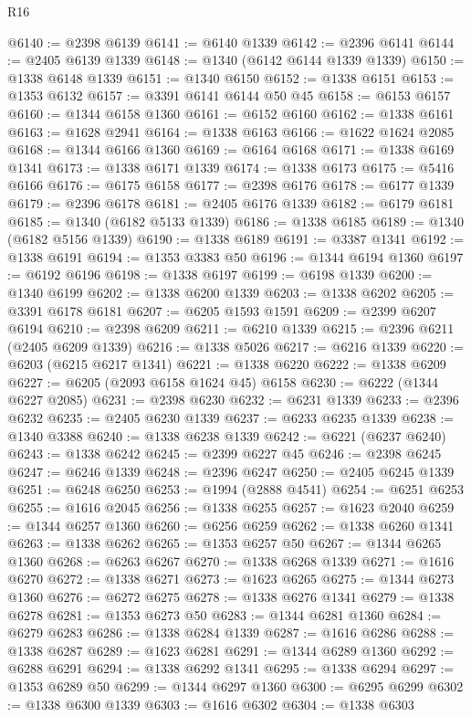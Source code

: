 \begin{lexlean}{R16}
\begin{coremodule}
@6140 := @2398 @6139
@6141 := @6140 @1339
@6142 := @2396 @6141
@6144 := @2405 @6139 @1339
@6148 := @1340 (@6142 @6144 @1339 @1339)
@6150 := @1338 @6148 @1339
@6151 := @1340 @6150
@6152 := @1338 @6151
@6153 := @1353 @6132
@6157 := @3391 @6141 @6144 @50 @45
@6158 := @6153 @6157
@6160 := @1344 @6158 @1360
@6161 := @6152 @6160
@6162 := @1338 @6161
@6163 := @1628 @2941
@6164 := @1338 @6163
@6166 := @1622 @1624 @2085
@6168 := @1344 @6166 @1360
@6169 := @6164 @6168
@6171 := @1338 @6169 @1341
@6173 := @1338 @6171 @1339
@6174 := @1338 @6173
@6175 := @5416 @6166
@6176 := @6175 @6158
@6177 := @2398 @6176
@6178 := @6177 @1339
@6179 := @2396 @6178
@6181 := @2405 @6176 @1339
@6182 := @6179 @6181
@6185 := @1340 (@6182 @5133 @1339)
@6186 := @1338 @6185
@6189 := @1340 (@6182 @5156 @1339)
@6190 := @1338 @6189
@6191 := @3387 @1341
@6192 := @1338 @6191
@6194 := @1353 @3383 @50
@6196 := @1344 @6194 @1360
@6197 := @6192 @6196
@6198 := @1338 @6197
@6199 := @6198 @1339
@6200 := @1340 @6199
@6202 := @1338 @6200 @1339
@6203 := @1338 @6202
@6205 := @3391 @6178 @6181
@6207 := @6205 @1593 @1591
@6209 := @2399 @6207 @6194
@6210 := @2398 @6209
@6211 := @6210 @1339
@6215 := @2396 @6211 (@2405 @6209 @1339)
@6216 := @1338 @5026
@6217 := @6216 @1339
@6220 := @6203 (@6215 @6217 @1341)
@6221 := @1338 @6220
@6222 := @1338 @6209
@6227 := @6205 (@2093 @6158 @1624 @45) @6158
@6230 := @6222 (@1344 @6227 @2085)
@6231 := @2398 @6230
@6232 := @6231 @1339
@6233 := @2396 @6232
@6235 := @2405 @6230 @1339
@6237 := @6233 @6235 @1339
@6238 := @1340 @3388
@6240 := @1338 @6238 @1339
@6242 := @6221 (@6237 @6240)
@6243 := @1338 @6242
@6245 := @2399 @6227 @45
@6246 := @2398 @6245
@6247 := @6246 @1339
@6248 := @2396 @6247
@6250 := @2405 @6245 @1339
@6251 := @6248 @6250
@6253 := @1994 (@2888 @4541)
@6254 := @6251 @6253
@6255 := @1616 @2045
@6256 := @1338 @6255
@6257 := @1623 @2040
@6259 := @1344 @6257 @1360
@6260 := @6256 @6259
@6262 := @1338 @6260 @1341
@6263 := @1338 @6262
@6265 := @1353 @6257 @50
@6267 := @1344 @6265 @1360
@6268 := @6263 @6267
@6270 := @1338 @6268 @1339
@6271 := @1616 @6270
@6272 := @1338 @6271
@6273 := @1623 @6265
@6275 := @1344 @6273 @1360
@6276 := @6272 @6275
@6278 := @1338 @6276 @1341
@6279 := @1338 @6278
@6281 := @1353 @6273 @50
@6283 := @1344 @6281 @1360
@6284 := @6279 @6283
@6286 := @1338 @6284 @1339
@6287 := @1616 @6286
@6288 := @1338 @6287
@6289 := @1623 @6281
@6291 := @1344 @6289 @1360
@6292 := @6288 @6291
@6294 := @1338 @6292 @1341
@6295 := @1338 @6294
@6297 := @1353 @6289 @50
@6299 := @1344 @6297 @1360
@6300 := @6295 @6299
@6302 := @1338 @6300 @1339
@6303 := @1616 @6302
@6304 := @1338 @6303

\end{coremodule}
\end{lexlean}

